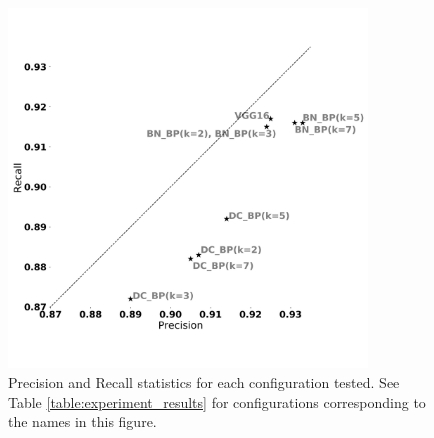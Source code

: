 \begin{figure}[!t]
	\centering
	\includegraphics[width=0.85\textwidth]{./thesis_code/plots/precision_recall_curve_all_configs_bw.png}
	\caption{Precision and Recall statistics for each configuration tested. See Table \ref{table:experiment_results} for configurations corresponding to the names in this figure.}
	\label{fig:bestmodel_precision_recall_curves}
\end{figure}

